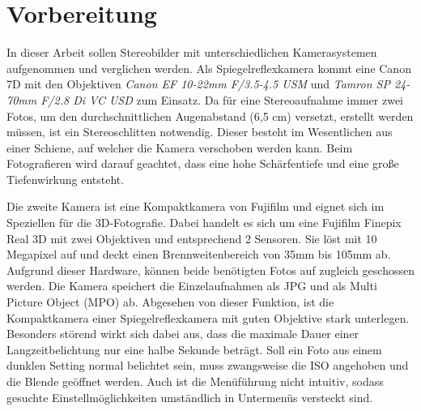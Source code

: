 \documentclass[liststotoc,bibtotoc,fontsize=14pt,]{scrreprt}
\begin{document}
	\chapter{Vorbereitung}
		In dieser Arbeit sollen Stereobilder mit unterschiedlichen Kamerasystemen aufgenommen und verglichen werden. Als Spiegelreflexkamera kommt eine Canon 7D mit den Objektiven \textit{Canon EF 10-22mm F/3.5-4.5 USM} und	\textit{Tamron SP 24-70mm F/2.8 Di VC USD} zum Einsatz. Da für eine Stereoaufnahme immer zwei Fotos, um den durchschnittlichen Augenabstand (6,5 cm) versetzt, erstellt werden müssen, ist ein Stereoschlitten notwendig. Dieser besteht im Wesentlichen aus einer Schiene, auf welcher die Kamera verschoben werden kann. Beim Fotografieren wird darauf geachtet, dass eine hohe Schärfentiefe und eine große Tiefenwirkung entsteht.
		
		Die zweite Kamera ist eine Kompaktkamera von Fujifilm und eignet sich im Speziellen für die 3D-Fotografie. Dabei handelt es sich um eine Fujifilm Finepix Real 3D mit zwei Objektiven und entsprechend 2 Sensoren. Sie löst mit 10 Megapixel auf und deckt einen Brennweitenbereich von 35mm bis 105mm ab. Aufgrund dieser Hardware, können beide benötigten Fotos auf zugleich geschossen werden. Die Kamera speichert die Einzelaufnahmen als JPG und als Multi Picture Object (MPO) ab. Abgesehen von dieser Funktion, ist die Kompaktkamera einer Spiegelreflexkamera mit guten Objektive stark unterlegen. Besonders störend wirkt sich dabei aus, dass die maximale Dauer einer Langzeitbelichtung nur eine halbe Sekunde beträgt. Soll ein Foto aus einem dunklen Setting normal belichtet sein, muss zwangsweise die ISO angehoben und die Blende geöffnet werden. Auch ist die Menüführung nicht intuitiv, sodass gesuchte Einstellmöglichkeiten umständlich in Untermenüs versteckt sind.
		
		
\end{document}
